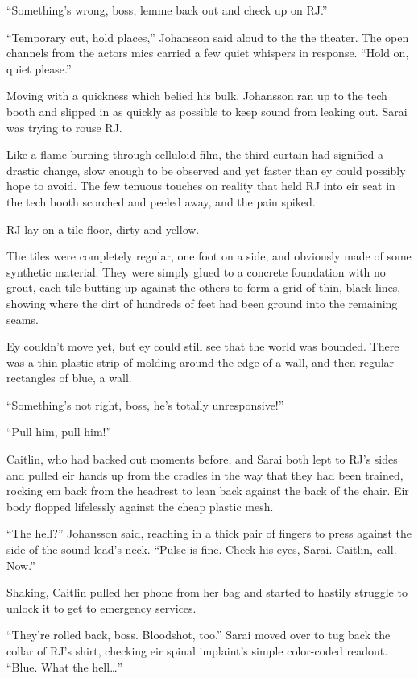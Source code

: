 ``Something's wrong, boss, lemme back out and check up on RJ.''

``Temporary cut, hold places,'' Johansson said aloud to the the theater.  The open channels from the actors mics carried a few quiet whispers in response.  ``Hold on, quiet please.''

Moving with a quickness which belied his bulk, Johansson ran up to the tech booth and slipped in as quickly as possible to keep sound from leaking out.  Sarai was trying to rouse RJ.

\secdiv

Like a flame burning through celluloid film, the third curtain had signified a drastic change, slow enough to be observed and yet faster than ey could possibly hope to avoid.  The few tenuous touches on reality that held RJ into eir seat in the tech booth scorched and peeled away, and the pain spiked.

RJ lay on a tile floor, dirty and yellow.

The tiles were completely regular, one foot on a side, and obviously made of some synthetic material.  They were simply glued to a concrete foundation with no grout, each tile butting up against the others to form a grid of thin, black lines, showing where the dirt of hundreds of feet had been ground into the remaining seams.

Ey couldn't move yet, but ey could still see that the world was bounded.  There was a thin plastic strip of molding around the edge of a wall, and then regular rectangles of blue, a wall.

\secdiv

``Something's not right, boss, he's totally unresponsive!''

``Pull him, pull him!''

Caitlin, who had backed out moments before, and Sarai both lept to RJ's sides and pulled eir hands up from the cradles in the way that they had been trained, rocking em back from the headrest to lean back against the back of the chair. Eir body flopped lifelessly against the cheap plastic mesh.

``The hell?'' Johansson said, reaching in a thick pair of fingers to press against the side of the sound lead's neck.  ``Pulse is fine.  Check his eyes, Sarai.  Caitlin, call.  Now.''

Shaking, Caitlin pulled her phone from her bag and started to hastily struggle to unlock it to get to emergency services.

``They're rolled back, boss.  Bloodshot, too.''  Sarai moved over to tug back the collar of RJ's shirt, checking eir spinal implaint's simple color-coded readout.  ``Blue.  What the hell\ldots{}''

